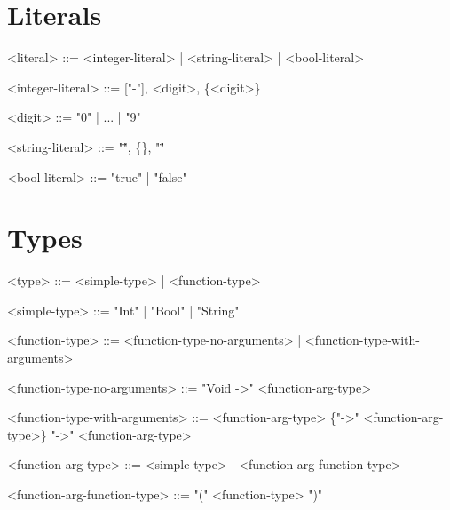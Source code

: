 \documentclass{article}
\author{Michał Majewski}
\begin{document}
\section{Literals}
\begin{grammar}
<literal> ::= <integer-literal> | <string-literal> | <bool-literal>

<integer-literal> ::= ["-"], <digit>, \{<digit>\}

<digit> ::= "0" | ... | "9"

<string-literal> ::= "\"", \{<ASCII-character>\}, "\""

<bool-literal> ::= "true" | "false"

\end{grammar}

\section{Types}
\begin{grammar}
<type> ::= <simple-type> | <function-type>

<simple-type> ::= "Int" | "Bool" | "String"

<function-type> ::= <function-type-no-arguments> | <function-type-with-arguments>

<function-type-no-arguments> ::= "Void ->" <function-arg-type>

<function-type-with-arguments> ::= <function-arg-type> \{"->" <function-arg-type>\} "->" <function-arg-type>

<function-arg-type> ::= <simple-type> | <function-arg-function-type>

<function-arg-function-type> ::= "(" <function-type> ")"

\end{grammar}
\end{document}
